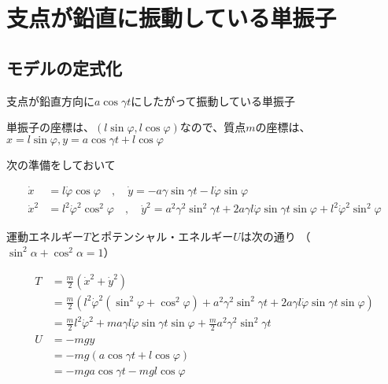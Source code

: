 \chapter{支点が鉛直に振動している単振子}

\section{モデルの定式化}

\begin{comment}
    \begin{figure}[htbp]
        \begin{minipage}[b]{0.45\linewidth}
          \centering
          \texttt{[image: vertical.eps]}
          \caption{支点が鉛直に振動している単振子}
        \end{minipage}
      \end{figure}
\end{comment}

支点が鉛直方向に$a\cos\gamma t$にしたがって振動している単振子

単振子の座標は、$(l\sin\varphi,l\cos\varphi)$なので、質点$m$の座標は、$x= l\sin\varphi, y = a\cos\gamma t + l\cos\varphi$

次の準備をしておいて

\begin{align*}
   \dot{x} &= l\dot{\varphi}\cos\varphi \quad , \quad \dot{y}=-a\gamma\sin\gamma t - l\dot{\varphi}\sin\varphi\\
   \dot{x}^2 &= l^2\dot{\varphi}^2\cos^2\varphi \quad , \quad \dot{y}^2 = a^2\gamma^2\sin^2\gamma t +2a\gamma l \dot{\varphi}\sin\gamma t \sin\varphi + l^2\dot{\varphi}^2\sin^2\varphi
\end{align*}

運動エネルギー$T$とポテンシャル・エネルギー$U$は次の通り
（$\sin^2\alpha+\cos^2\alpha=1$）

\begin{align*}
   T &= \frac{m}{2}\left(\dot{x}^2+\dot{y}^2\right)\\
   &=\frac{m}{2}\left(l^2\dot{\varphi}^2\left(\sin^2\varphi+\cos^2\varphi\right) +a^2\gamma^2\sin^2\gamma t + 2a\gamma l \dot{\varphi}\sin\gamma t\sin\varphi\right)\\
   &=\frac{m}{2}l^2\dot{\varphi}^2 + ma\gamma l\dot{\varphi}\sin\gamma t\sin\varphi + \frac{m}{2}a^2\gamma^2\sin^2\gamma t\\
   U &= -mgy\\&=-mg(a\cos\gamma t +l\cos\varphi)\\&=-mga\cos\gamma t - mgl\cos\varphi
\end{align*}

